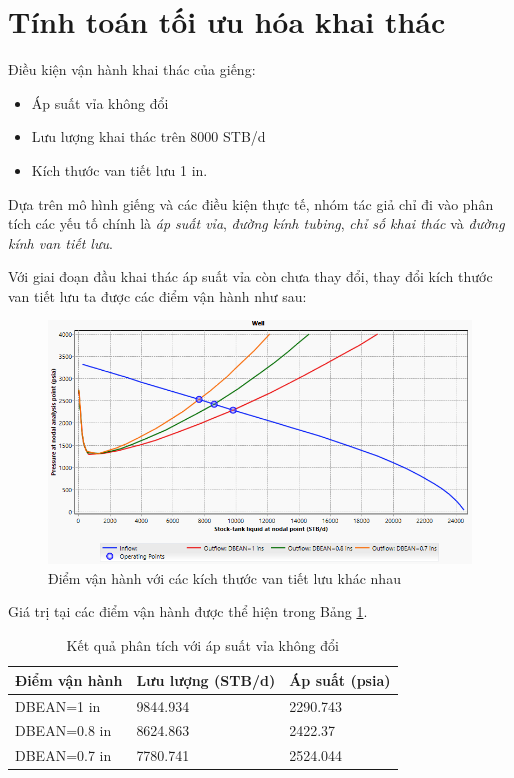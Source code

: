 \documentclass[12pt,a4paper]{report}
\begin{document}
\section{Tính toán tối ưu hóa khai thác}
Điều kiện vận hành khai thác của giếng:
	\begin{itemize}
		\item Áp suất vỉa không đổi
		\item Lưu lượng khai thác trên 8000 STB/d
		\item Kích thước van tiết lưu 1 in.
	\end{itemize}
Dựa trên mô hình giếng và các điều kiện thực tế, nhóm tác giả chỉ đi vào phân tích các yếu tố chính là \textit{áp suất vỉa}, \textit{đường kính tubing}, \textit{chỉ số khai thác} và \textit{đường kính van tiết lưu}.

Với giai đoạn đầu khai thác áp suất vỉa còn chưa thay đổi, thay đổi kích thước van tiết lưu ta được các điểm vận hành như sau:
\newpage
	\begin{figure}[h]
		\centering
		\includegraphics[scale=0.75]{Fig/Static_press_vs_choke.PNG}
		\caption{Điểm vận hành với các kích thước van tiết lưu khác nhau}
		\label{fig:Static_press_vs_choke}
	\end{figure}
Giá trị tại các điểm vận hành được thể hiện trong Bảng \ref{tab:static_press_vs_choke_result}.
\begin{table}[h]
\caption{Kết quả phân tích với áp suất vỉa không đổi}\label{tab:static_press_vs_choke_result}
\begin{tabularx}{\textwidth}{@{}XXX@{}}
\toprule
Điểm vận hành & Lưu lượng (STB/d) & Áp suất (psia) \\ \midrule
DBEAN=1 in    & 9844.934          & 2290.743       \\
DBEAN=0.8 in  & 8624.863          & 2422.37        \\
DBEAN=0.7 in  & 7780.741          & 2524.044       \\ \bottomrule
\end{tabularx}
\end{table}
\end{document}

